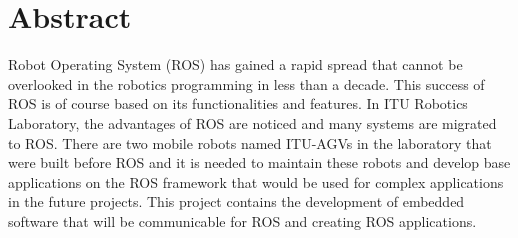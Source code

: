 

\chapter{Abstract}
Robot Operating System (ROS) has gained a rapid spread that cannot be overlooked in the robotics programming in less than a decade. This success of ROS is of course based on its functionalities and features. In ITU Robotics Laboratory, the advantages of ROS are noticed and many systems are migrated to ROS. There are two mobile robots named ITU-AGVs in the laboratory that were built before ROS and it is needed to maintain these robots and develop base applications on the ROS framework that would be used for complex applications in the future projects. This project contains the development of embedded software that will be communicable for ROS and creating ROS applications.